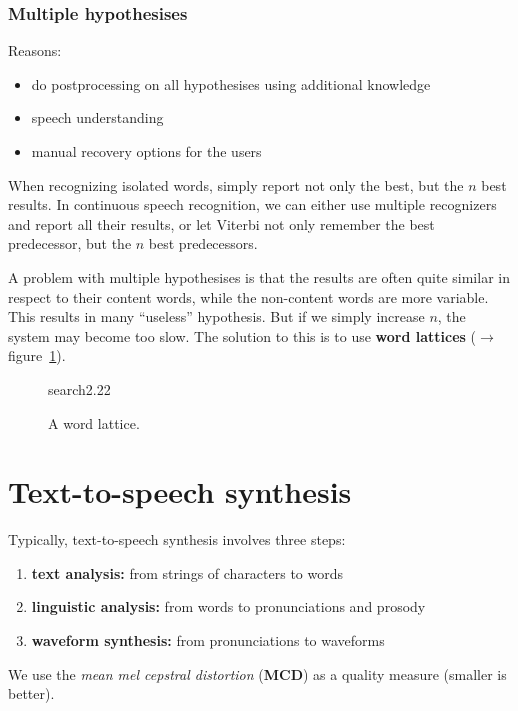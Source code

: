 \documentclass[11pt]{article}
\begin{document}
\subsubsection{Multiple hypothesises}
Reasons:
\begin{itemize}
    \item do postprocessing on all hypothesises using additional knowledge
    \item speech understanding
    \item manual recovery options for the users
\end{itemize}
When recognizing isolated words, simply report not only the best, but the $n$ best results. In continuous speech recognition, we can either use multiple recognizers and report all their results, or let Viterbi not only remember the best predecessor, but the $n$ best predecessors.

A problem with multiple hypothesises is that the results are often quite similar in respect to their content words, while the non-content words are more variable. This results in many ``useless'' hypothesis. But if we simply increase $n$, the system may become too slow. The solution to this is to use \textbf{word lattices} ($\to$ figure~\ref{fig:wordLattice}).
\begin{figure}[htb]
    \begin{minipage}{\linewidth}
        \vspace{3cm}
        \hfill \scriptsize search2.22
    \end{minipage}
    \caption{\label{fig:wordLattice} A word lattice.}
\end{figure}

\section{Text-to-speech synthesis}

Typically, text-to-speech synthesis involves three steps:
\begin{enumerate}
    \item \textbf{text analysis:} from strings of characters to words
    \item \textbf{linguistic analysis:} from words to pronunciations and prosody
    \item \textbf{waveform synthesis:} from pronunciations to waveforms
\end{enumerate}

We use the \textit{mean mel cepstral distortion} (\textbf{MCD}) as a quality measure (smaller is better).
\end{document}
